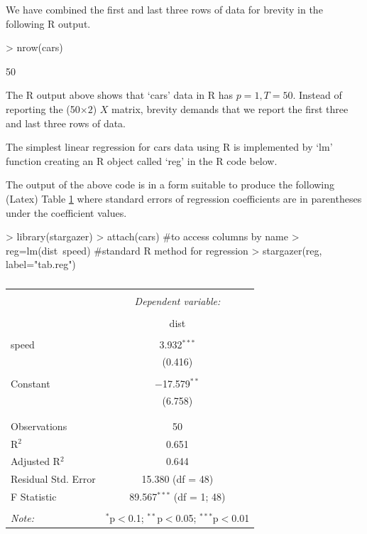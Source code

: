 \documentclass[12pt]{article}
\begin{document}
We have combined the first and last three rows of data for brevity in
the following R output.

\begin{Schunk}
\begin{Sinput}
> nrow(cars)
\end{Sinput}
\begin{Soutput}
[1] 50
\end{Soutput}
\end{Schunk}

The R output above shows that `cars' data in R has $p=1, T=50$.
Instead of reporting the  (50$\times 2$) $X$ matrix,
brevity demands that we report the first three and last three rows of data. 

The simplest linear regression for cars data using R
is implemented by `lm' function creating an R object called `reg'
in the R code below.

The output of the above code is in a form suitable to produce
the following (Latex) Table \ref{tab.reg} where standard errors
of regression coefficients are in parentheses under the coefficient
values.

\begin{Schunk}
\begin{Sinput}
> library(stargazer)	
> attach(cars) #to access columns by name
> reg=lm(dist~speed) #standard R method for regression
> stargazer(reg, label="tab.reg")
\end{Sinput}
\begin{table}[!htbp] \centering 
  \caption{} 
  \label{tab.reg} 
\begin{tabular}{@{\extracolsep{5pt}}lc} 
\\[-1.8ex]\hline 
\hline \\[-1.8ex] 
 & \multicolumn{1}{c}{\textit{Dependent variable:}} \\ 
\cline{2-2} 
\\[-1.8ex] & dist \\ 
\hline \\[-1.8ex] 
 speed & 3.932$^{***}$ \\ 
  & (0.416) \\ 
  & \\ 
 Constant & $-$17.579$^{**}$ \\ 
  & (6.758) \\ 
  & \\ 
\hline \\[-1.8ex] 
Observations & 50 \\ 
R$^{2}$ & 0.651 \\ 
Adjusted R$^{2}$ & 0.644 \\ 
Residual Std. Error & 15.380 (df = 48) \\ 
F Statistic & 89.567$^{***}$ (df = 1; 48) \\ 
\hline 
\hline \\[-1.8ex] 
\textit{Note:}  & \multicolumn{1}{r}{$^{*}$p$<$0.1; $^{**}$p$<$0.05; $^{***}$p$<$0.01} \\ 
\end{tabular} 
\end{table} \end{Schunk}
\end{document}
